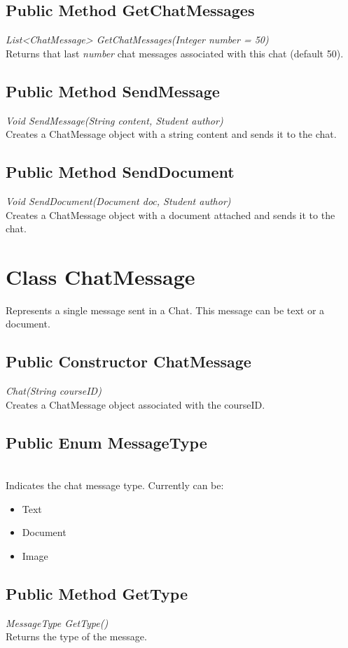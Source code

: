 \documentclass[16pt]{scrreprt}
\begin{document}
\subsection{Public Method GetChatMessages}
\textit{List<ChatMessage> GetChatMessages(Integer number = 50)} \\
Returns that last \textit{number} chat messages associated with this chat (default 50).

\subsection{Public Method SendMessage}
\textit{Void SendMessage(String content, Student author)} \\
Creates a ChatMessage object with a string content and sends it to the chat.

\subsection{Public Method SendDocument}
\textit{Void SendDocument(Document doc, Student author)} \\
Creates a ChatMessage object with a document attached and sends it to the chat.

\section{Class ChatMessage}
Represents a single message sent in a Chat. This message can be text or a document.

\subsection{Public Constructor ChatMessage}
\textit{Chat(String courseID)} \\
Creates a ChatMessage object associated with the courseID.

\subsection{Public Enum MessageType}
\textit{} \\
Indicates the chat message type. Currently can be:
\begin{itemize}
	\item Text
	\item Document
	\item Image
\end{itemize}

\subsection{Public Method GetType}
\textit{MessageType GetType()} \\
Returns the type of the message.
\end{document}
